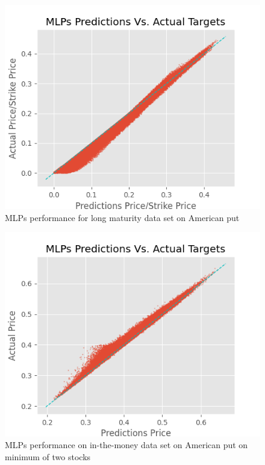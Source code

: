 \begin{figure}[th]
\centering
\includegraphics{Figures/longTAmerP.png}
\decoRule
\caption[MLPs Performance for Long Maturity Data Set American Put]{MLPs performance for long maturity data set on American put}
\label{fig:MLPsAmerPLongT}
\end{figure}

\begin{figure}[th]
\centering
\includegraphics{Figures/inMoneyAmerMinP.png}
\decoRule
\caption[MLPs Performance for In-the-Money Data Set Bivariate American Contingent Claim]{MLPs performance on in-the-money data set on American put on minimum of two stocks}
\label{fig:MLPsAmerMin2}
\end{figure}

